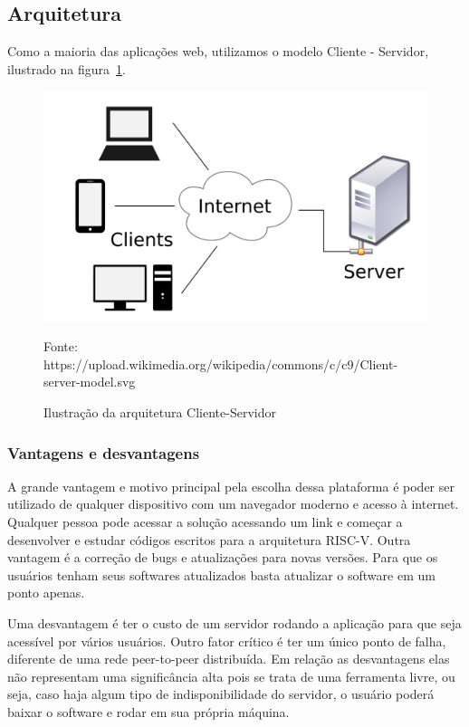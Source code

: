 	\subsection{Arquitetura}
		
		Como a maioria das aplicações web, utilizamos o modelo Cliente - Servidor, ilustrado na figura~\ref{fig:client-server-model}.

		\begin{figure}[h]
		  \includegraphics[width=\linewidth]{img/client-server-model.png}
		  \caption{Ilustração da arquitetura Cliente-Servidor}
		  Fonte: https://upload.wikimedia.org/wikipedia/commons/c/c9/Client-server-model.svg
		  \label{fig:client-server-model}
		\end{figure}

		\subsubsection{Vantagens e desvantagens}

			A grande vantagem e motivo principal pela escolha dessa plataforma é poder ser utilizado de qualquer dispositivo com um navegador moderno e acesso à internet. Qualquer pessoa pode acessar a solução acessando um link e começar a desenvolver e estudar códigos escritos para a arquitetura RISC-V. 
			Outra vantagem é a correção de bugs e atualizações para novas versões. Para que os usuários tenham seus softwares atualizados basta atualizar o software em um ponto apenas.

			Uma desvantagem é ter o custo de um servidor rodando a aplicação para que seja acessível por vários usuários. Outro fator crítico é ter um único ponto de falha, diferente de uma rede peer-to-peer distribuída.
			Em relação as desvantagens elas não representam uma significância alta pois se trata de uma ferramenta livre, ou seja, caso haja algum tipo de indisponibilidade do servidor, o usuário poderá baixar o software e rodar em sua própria máquina. 


